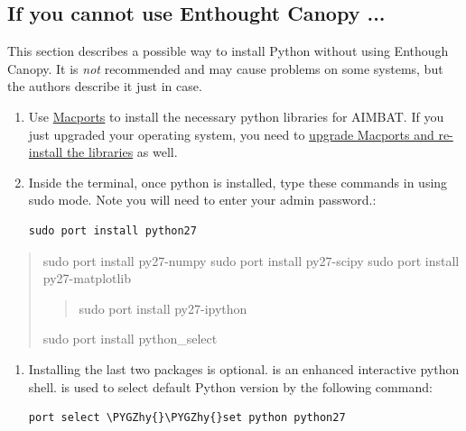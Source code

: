\documentclass[letterpaper,10pt,english]{sphinxmanual}
\def\PYGZhy{\char`\-}
\begin{document}
\subsection{If you cannot use Enthought Canopy ...}
\label{docfiles/install_dependencies:if-you-cannot-use-enthought-canopy}
This section describes a possible way to install Python without using Enthough Canopy. It is \emph{not} recommended and may cause problems on some systems, but the authors describe it just in case.
\begin{enumerate}
\item {} 
Use \href{http://guide.macports.org/}{Macports} to install the necessary python libraries for AIMBAT. If you just upgraded your operating system, you need to \href{https://trac.macports.org/wiki/Migration}{upgrade Macports and re-install the libraries} as well.

\item {} 
Inside the terminal, once python is installed, type these commands in using sudo mode. Note you will need to enter your admin password.:

\begin{Verbatim}[commandchars=\\\{\}]
sudo port install python27
\end{Verbatim}

\end{enumerate}
\begin{quote}

sudo port install py27-numpy
sudo port install py27-scipy
sudo port install py27-matplotlib
\begin{quote}

sudo port install py27-ipython
\end{quote}

sudo port install python\_select
\end{quote}
\begin{enumerate}
\item {} 
Installing the last two packages is optional.  is an enhanced interactive python shell.  is used to select default Python version by the following command:

\begin{Verbatim}[commandchars=\\\{\}]
port select \PYGZhy{}\PYGZhy{}set python python27
\end{Verbatim}

\end{enumerate}
\end{document}
